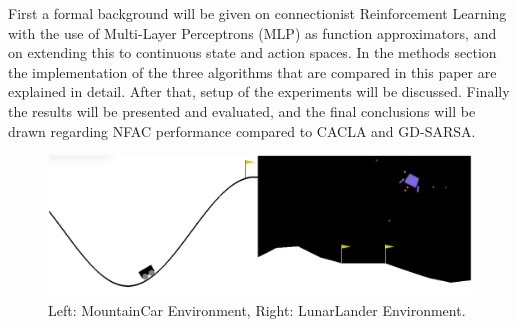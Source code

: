 




First a formal background will be given on connectionist Reinforcement Learning with the use of Multi-Layer Perceptrons (MLP) as function approximators, and on extending this to continuous state and action spaces. In the methods section the implementation of the three algorithms that are compared in this paper are explained in detail. After that, setup of the experiments will be discussed. Finally the results will be presented and evaluated, and the final conclusions will be drawn regarding NFAC performance compared to CACLA and GD-SARSA.

\begin{figure}[t]
 \centering 
    \includegraphics[width = 0.7\columnwidth]{figs/mountainlunar.png}
 \caption{Left: MountainCar Environment, Right: LunarLander Environment.}
\label{fig:mountainlunar}
\end{figure}

